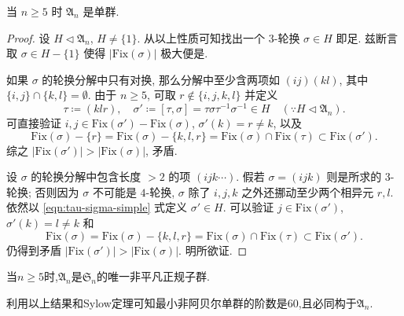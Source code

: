 \begin{theorem}[É. Galois]\label{prop:A_n-simple}
	当 $n \geq 5$ 时 $\mathfrak{A}_n$ 是单群.
\end{theorem}
\begin{proof}
	设 $H \lhd \mathfrak{A}_n$, $H \neq \{1\}$. 从以上性质可知找出一个 $3$-轮换 $\sigma \in H$ 即足. 兹断言取 $\sigma \in H - \{1\}$ 使得 $\left|\text{Fix}(\sigma)\right|$ 极大便是.
	
	如果 $\sigma$ 的轮换分解中只有对换, 那么分解中至少含两项如 $(i j) (k l)$, 其中 $\{i,j\} \cap \{k,l\} = \emptyset$. 由于 $n \geq 5$, 可取 $r \notin \{i,j,k, l\}$ 并定义
	\begin{equation}\label{eqn:tau-sigma-simple}
		\tau \coloneqq (k l r), \quad \sigma' \coloneqq [\tau, \sigma] = \tau\sigma\tau^{-1}\sigma^{-1} \in H \quad (\because H \lhd \mathfrak{A}_n).
	\end{equation}
	可直接验证 $i,j \in \text{Fix}(\sigma') - \text{Fix}(\sigma)$, $\sigma'(k) = r \neq k$, 以及
	\[ \text{Fix}(\sigma) - \{r\} = \text{Fix}(\sigma) - \{k, l, r\} = \text{Fix}(\sigma) \cap \text{Fix}(\tau) \subset \text{Fix}(\sigma'). \]
	综之 $\left|\text{Fix}(\sigma')\right| > \left|\mathrm{Fix}(\sigma)\right|$, 矛盾.
	
	设 $\sigma$ 的轮换分解中包含长度 $>2$ 的项 $(i j k \cdots)$. 假若 $\sigma = (i j k)$ 则是所求的 $3$-轮换; 否则因为 $\sigma$ 不可能是 $4$-轮换, $\sigma$ 除了 $i,j,k$ 之外还挪动至少两个相异元 $r, l$. 依然以 \eqref{eqn:tau-sigma-simple} 式定义 $\sigma' \in H$. 可以验证 $j \in \text{Fix}(\sigma')$, $\sigma'(k) = l \neq k$ 和
	\[ \text{Fix}(\sigma) = \text{Fix}(\sigma) - \{k,l,r\} = \text{Fix}(\sigma) \cap \text{Fix}(\tau) \subset \text{Fix}(\sigma'). \]
	仍得到矛盾 $\left|\text{Fix}(\sigma')\right| > \left|\mathrm{Fix}(\sigma)\right|$. 明所欲证.
\end{proof}
\begin{corollary}
	当$n\geqslant5$时,$\mathfrak{A}_n$是$\mathfrak{S}_n$的唯一非平凡正规子群.
\end{corollary}

利用以上结果和Sylow定理可知最小非阿贝尔单群的阶数是60,且必同构于$\mathfrak{A}_n$.

